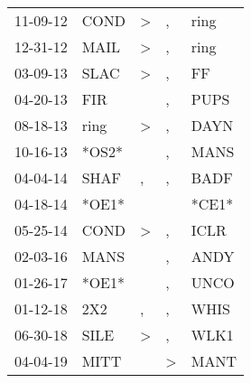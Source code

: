 \begin{supertabular}{p{0.07\textwidth}p{0.06\textwidth}p{0.02\textwidth}p{0.02\textwidth}p{0.06\textwidth}}
 11-09-12\textsuperscript{} &          COND\textsuperscript{} &     \textgreater &             , &           ring\textsuperscript{} \\
 12-31-12\textsuperscript{} &          MAIL\textsuperscript{} &     \textgreater &             , &           ring\textsuperscript{} \\
 03-09-13\textsuperscript{} &          SLAC\textsuperscript{} &     \textgreater &             , &             FF\textsuperscript{} \\
 04-20-13\textsuperscript{} &           FIR\textsuperscript{} &                  &             , &           PUPS\textsuperscript{} \\
 08-18-13\textsuperscript{} &          ring\textsuperscript{} &     \textgreater &             , &           DAYN\textsuperscript{} \\
 10-16-13\textsuperscript{} &                           *OS2* &                  &             , &           MANS\textsuperscript{} \\
 04-04-14\textsuperscript{} &          SHAF\textsuperscript{} &                , &             , &           BADF\textsuperscript{} \\
 04-18-14\textsuperscript{} &                           *OE1* &                  &               &                            *CE1* \\
 05-25-14\textsuperscript{} &          COND\textsuperscript{} &     \textgreater &             , &           ICLR\textsuperscript{} \\
 02-03-16\textsuperscript{} &          MANS\textsuperscript{} &                  &             , &           ANDY\textsuperscript{} \\
 01-26-17\textsuperscript{} &                           *OE1* &                  &             , &           UNCO\textsuperscript{} \\
 01-12-18\textsuperscript{} &           2X2\textsuperscript{} &                , &             , &           WHIS\textsuperscript{} \\
 06-30-18\textsuperscript{} &          SILE\textsuperscript{} &     \textgreater &             , &           WLK1\textsuperscript{} \\
 04-04-19\textsuperscript{} &          MITT\textsuperscript{} &                  &  \textgreater &           MANT\textsuperscript{} \\
\end{supertabular}
